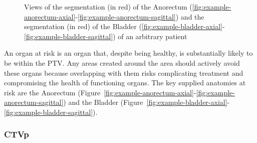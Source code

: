 \documentclass[12pt,twoside]{report}
\begin{document}
\begin{figure}[H]
{   \label{fig:example-bladder-coronal}
  }
  \caption{Views of the segmentation (in red) of the Anorectum (\ref{fig:example-anorectum-axial}-\ref{fig:example-anorectum-sagittal}) and  the segmentation (in red) of the Bladder (\ref{fig:example-bladder-axial}-\ref{fig:example-bladder-sagittal}) of an arbitrary patient}
\end{figure}

An organ at risk is an organ that, despite being healthy, is substantially likely to be within the PTV. Any areas created around the area should actively avoid these organs because overlapping with them risks complicating treatment and compromising the health of functioning organs. The key supplied anatomies at risk are the  Anorectum (Figure~\ref{fig:example-anorectum-axial}-\ref{fig:example-anorectum-sagittal}) and the Bladder (Figure~\ref{fig:example-bladder-axial}-\ref{fig:example-bladder-sagittal}).

\subsubsection{CTVp}\label{sec:data-CTVp}
\end{document}
